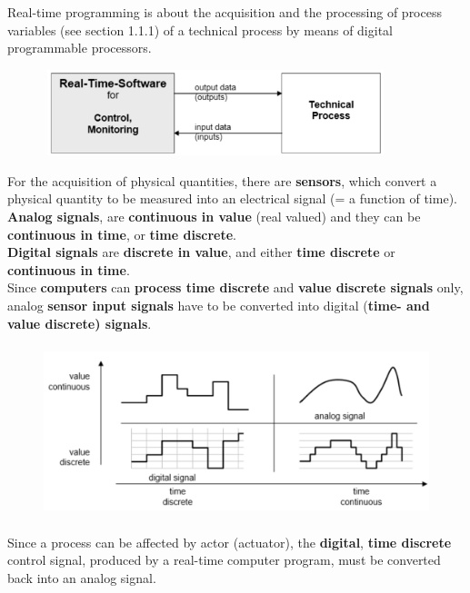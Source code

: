 Real-time programming is about the acquisition and the processing of process variables (see section 1.1.1) of a technical process by means of digital programmable processors. 

    \begin{figure}[h]
    \centering
    \includegraphics[width=10cm, height=2.5cm]{Images/image135.png}
    \label{fig:Fig 86}
    \end{figure}
    
For the acquisition of physical quantities, there are \textbf{sensors}, which convert a physical quantity to be measured into an electrical signal (= a function of time).\\

\textbf{Analog signals}, are \textbf{continuous in value} (real valued) and they can be \textbf{continuous in time}, or \textbf{time discrete}. \\

\textbf{Digital signals} are \textbf{discrete in value}, and either \textbf{time discrete} or \textbf{continuous in time}.\\

Since \textbf{computers} can \textbf{process time discrete} and \textbf{value discrete signals} only, analog \textbf{sensor input signals} have to be converted into digital (\textbf{time- and value discrete) signals}.

    \begin{figure}[h]
    \centering
    \includegraphics[width=14cm, height=5cm]{Images/image136.png}
    \label{fig:Fig 87}
    \end{figure}

Since a process can be affected by actor (actuator), the \textbf{digital}, \textbf{time discrete} control signal, produced by a real-time computer program, must be converted back into an analog signal.

